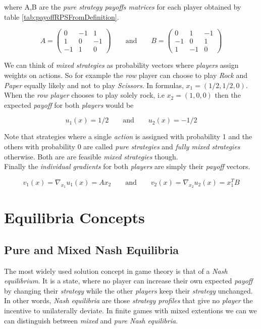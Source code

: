 where A,B are the \textit{pure strategy payoffs matrices} for each player obtained by table \ref{tab:payoffRPSFromDefinition}.

\begin{equation*}
A = \begin{pmatrix}
0 & -1 & 1\\
1 & 0 & -1\\
-1 & 1 & 0
\end{pmatrix}
\qquad \text{and} \qquad
B = \begin{pmatrix}
0 & 1 & -1\\
-1 & 0 & 1\\
1 & -1 & 0
\end{pmatrix}
\end{equation*}

We can think of \textit{mixed strategies} as probability vectors where \textit{players} assign weights on actions. So for example the \textit{row} player can choose to play \textit{Rock} and \textit{Paper} equally likely and not to play \textit{Scissors}. In formulas, $x_1 = (1/2,1/2,0)$. When the \textit{row player} chooses to play solely rock, i.e $x_2 = (1,0,0)$ then the expected \textit{payoff} for both \textit{players} would be

\begin{equation*}
    u_1(x) = 1/2  \qquad \text{and} \qquad u_2(x) = -1/2
\end{equation*}

Note that strategies where a single \textit{action} is assigned with probability 1 and the others with probability 0 are called \textit{pure strategies} and \textit{fully mixed strategies} otherwise. Both are are feasible \textit{mixed strategies} though. \\ 

Finally the \textit{individual gradients} for both \textit{players} are simply their \textit{payoff} vectors.

\begin{equation*}
    v_1(x) = \nabla_{x_1}u_1(x) = Ax_2 \qquad \text{and} \qquad v_2(x) = \nabla_{x_2}u_2(x) = x_{1}^{T}B
\end{equation*}


\section{Equilibria Concepts}\label{section:equilibriaConcepts}


\subsection{Pure and Mixed Nash Equilibria}\label{subsection:PNEandMNE}
The most widely used solution concept in game theory is that of a \textit{Nash equilibrium}. It is a state, where no player can increase their own expected \textit{payoff} by changing their \textit{strategy} while the other \textit{players} keep their \textit{strategy} unchanged. In other words, \textit{Nash equilibria} are those \textit{strategy profiles} that give no \textit{player} the incentive to unilaterally deviate. In finite games with mixed extentions we can we can distinguish between \textit{mixed} and \textit{pure Nash equilibria}. 

